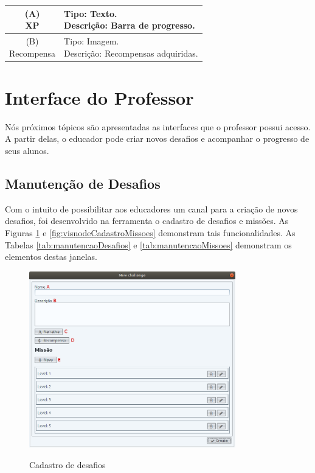 \documentclass[
	12pt,				%
	oneside,			%
	a4paper,			%
	english,			%
	french,				%
	spanish,			%
	brazil,				%
	]{abntex2}
\begin{document}
\begin{table}[H]
\centering
{} \label{tab:listagemMissoesConcluidas}
\renewcommand{\arraystretch}{1.8}
\setlength{\tabcolsep}{10pt}
\begin{tabular}{|c|l|}
  \hline
  \makecell{(A) \\ XP} 
  &
  \makecell[l]{Tipo: Texto.\\ Descrição: Barra de progresso.} \\
  \hline
  \makecell{(B) \\ Recompensa} 
  &
  \makecell[l]{Tipo: Imagem.\\ Descrição: Recompensas adquiridas.} \\
  \hline
 
\end{tabular}
\centering
\sourceAuthor
\end{table}

\section{Interface do Professor}

Nós próximos tópicos são apresentadas as interfaces que o professor possui acesso. A partir delas, o educador pode criar novos desafios e acompanhar o progresso de seus alunos.

\subsection{Manutenção de Desafios}

Com o intuito de possibilitar aos educadores um canal para a criação de novos desafios, foi desenvolvido na ferramenta o cadastro de desafios e missões. As Figuras \ref{fig:visnodeCadastroDesafio} e \ref{fig:visnodeCadastroMissoes} demonstram tais funcionalidades. As Tabelas \ref{tab:manutencaoDesafios} e \ref{tab:manutencaoMissoes} demonstram os elementos destas janelas.

\begin{figure}[H]
\centering
\caption{Cadastro de desafios}
\includegraphics[width=0.8\textwidth]{imagens/visnode_cadastro_desafio.png}
\sourceAuthor
\label{fig:visnodeCadastroDesafio}
\end{figure}
\end{document}
